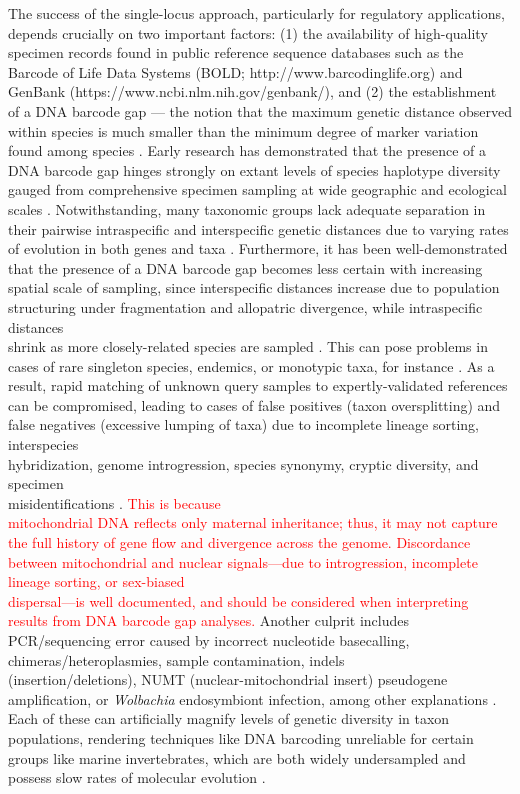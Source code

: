 \documentclass[12pt]{article}
\begin{document}
The success of the single-locus approach, particularly for regulatory applications, depends crucially on two important factors: (1) the availability of high-quality specimen records found in public reference sequence databases such as the Barcode of Life Data Systems (BOLD; http://www.barcodinglife.org) \citep{ratnasingham2007bold} and GenBank (https://www.ncbi.nlm.nih.gov/genbank/), and (2) the establishment of a DNA barcode gap --- the notion that the maximum genetic distance observed within species is much smaller than the minimum degree of marker variation found among species \citep{meyer2005dna, meier2008use}. Early research has demonstrated that the presence of a DNA barcode gap hinges strongly on extant levels of species haplotype diversity gauged from comprehensive specimen sampling at wide geographic and ecological scales \citep{bergsten2012effect, candek2015dna, chen2022large}. Notwithstanding, many taxonomic groups lack adequate separation in their pairwise intraspecific and interspecific genetic distances due to varying rates of evolution in both genes and taxa \citep{pentinsaari2016molecular}. Furthermore, it has been well-demonstrated that the presence of a DNA barcode gap becomes less certain with increasing spatial scale of sampling, since interspecific distances increase due to population structuring under fragmentation and allopatric divergence, while intraspecific distances \\ shrink as more closely-related species are sampled \citep{phillips2022lack}. This can pose problems in cases of rare singleton species, endemics, or monotypic taxa, for instance \citep{ahrens2016rarity}.  As a result, rapid matching of unknown query samples to expertly-validated references can be compromised, leading to cases of false positives (taxon oversplitting) and false negatives (excessive lumping of taxa) due to incomplete lineage sorting, interspecies \\ hybridization, genome introgression, species synonymy, cryptic diversity, and specimen \\ misidentifications \citep{hubert2015dna, phillips2022lack}. \textcolor{red}{This is because \\ mitochondrial DNA reflects only maternal inheritance; thus, it may not capture the full history of gene flow and divergence across the genome. Discordance between mitochondrial and nuclear signals---due to introgression, incomplete lineage sorting, or sex-biased \\ dispersal---is well documented, and should be considered when interpreting results from DNA barcode gap analyses.} Another culprit includes PCR/sequencing error caused by incorrect nucleotide basecalling, chimeras/heteroplasmies, sample contamination, indels \\ (insertion/deletions), NUMT (nuclear-mitochondrial insert) pseudogene amplification, or \textit{Wolbachia} endosymbiont infection, among other explanations \citep{phillips2023vlf}. Each of these can artificially magnify levels of genetic diversity in taxon populations, rendering techniques like DNA barcoding unreliable for certain groups like marine invertebrates, which are both widely undersampled and possess slow rates of molecular evolution \citep{bucklin2011dna}.
\end{document}
